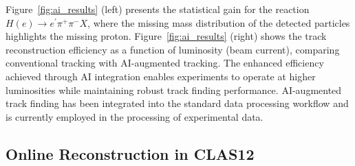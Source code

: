 Figure~\ref{fig:ai_results} (left) presents the statistical gain for the reaction $H(e) \rightarrow e^\prime\pi^+\pi^-X$, where the missing mass distribution of the detected particles highlights the missing proton. Figure~\ref{fig:ai_results} (right) shows the track reconstruction efficiency as a function of luminosity (beam current), comparing conventional tracking with AI-augmented tracking. The enhanced efficiency achieved through AI integration enables experiments to operate at higher luminosities while maintaining robust track finding performance. AI-augmented track finding has been integrated into the standard data processing workflow and is currently employed in the processing of experimental data.

\subsection{Online Reconstruction in CLAS12}

